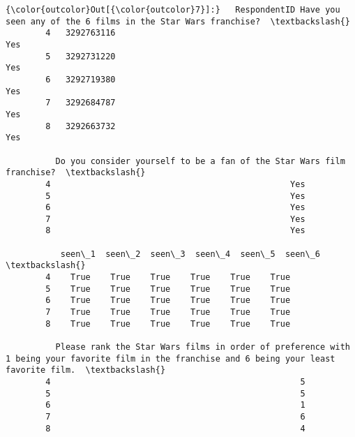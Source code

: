 \documentclass[11pt]{article}
\begin{document}
\begin{Verbatim}[commandchars=\\\{\}]
{\color{outcolor}Out[{\color{outcolor}7}]:}   RespondentID Have you seen any of the 6 films in the Star Wars franchise?  \textbackslash{}
        4   3292763116                                                Yes             
        5   3292731220                                                Yes             
        6   3292719380                                                Yes             
        7   3292684787                                                Yes             
        8   3292663732                                                Yes             
        
          Do you consider yourself to be a fan of the Star Wars film franchise?  \textbackslash{}
        4                                                Yes                      
        5                                                Yes                      
        6                                                Yes                      
        7                                                Yes                      
        8                                                Yes                      
        
           seen\_1  seen\_2  seen\_3  seen\_4  seen\_5  seen\_6  \textbackslash{}
        4    True    True    True    True    True    True   
        5    True    True    True    True    True    True   
        6    True    True    True    True    True    True   
        7    True    True    True    True    True    True   
        8    True    True    True    True    True    True   
        
          Please rank the Star Wars films in order of preference with 1 being your favorite film in the franchise and 6 being your least favorite film.  \textbackslash{}
        4                                                  5                                                                                              
        5                                                  5                                                                                              
        6                                                  1                                                                                              
        7                                                  6                                                                                              
        8                                                  4                                                                                              
        

\end{Verbatim}
\end{document}
